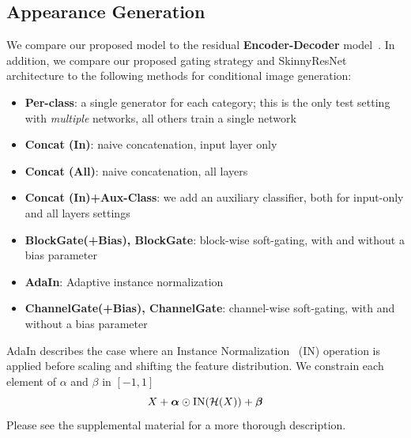 \subsection{Appearance Generation}
We compare our proposed model to the residual \textbf{Encoder-Decoder} model~\cite{huang2018multimodal}.
In addition, we compare our proposed gating strategy and SkinnyResNet architecture to the following methods for  conditional image generation: \begin{itemize}[noitemsep]
\item{\bf Per-class}: a single generator for each category; this is the only test setting with \textit{multiple} networks, all others train a single network
\item{\bf Concat (In)}: naive concatenation, input layer only
\item{\bf Concat (All)}: naive concatenation, all layers
\item{\bf Concat (In)+Aux-Class}: we add an auxiliary classifier, both for input-only and all layers settings
\item{\bf BlockGate(+Bias), BlockGate}: block-wise soft-gating, with and without a bias parameter
\item{\bf AdaIn}: Adaptive instance normalization
\item{\bf ChannelGate(+Bias), ChannelGate}: channel-wise soft-gating, with and without a bias parameter
\end{itemize}
AdaIn describes the case where an Instance Normalization~\cite{ulyanovinstance} (IN) operation is applied before scaling and shifting the feature distribution.
We constrain each element of {\boldmath $\alpha$} and {\boldmath $\beta$} in $[-1, 1]$ %
\vspace{-2mm}
\begin{equation}
X + \mbox{\boldmath $\alpha$} \odot \text{IN} (\mathcal{H}(X)) + \mbox{\boldmath $\beta$}
\end{equation}
Please see the supplemental material for a more thorough description.


